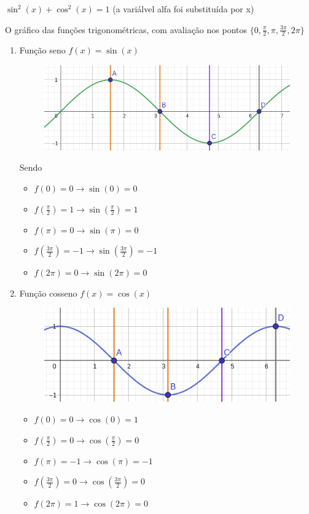 \begin{multicols*}{2}
    $\sin^2(x) + \cos^2(x) = 1$ (a variálvel alfa foi substituída por x)
    
    O gráfico das funções trigonométricas, com avaliação nos pontos 
    $\Big\{ 0, \frac{\pi}{2}, \pi, \frac{3 \pi}{2}, 2 \pi \Big\}$
    
    \begin{enumerate}
    \item Função seno $f(x) = \sin(x)$
    \begin{figure}[H]
        \includegraphics[scale=0.3]{assets/rafael/img33.png}
    \end{figure}
    Sendo 
    \begin{itemize}
    \item $f(0) = 0 \rightarrow \sin(0) = 0 $
    \item $f\left(\frac{\pi}{2} \right) = 1 \rightarrow \sin \left( \frac{\pi}{2} \right) = 1 $
    \item $f(\pi) = 0 \rightarrow \sin(\pi) = 0$
    \item $f\left( \frac{3 \pi}{2} \right) = -1 \rightarrow \sin \left( \frac{3 \pi}{2}\right) = -1$
    \item $f(2 \pi) = 0 \rightarrow \sin(2 \pi) = 0$
    \end{itemize}
    
    \item Função cosseno $f(x) = \cos(x)$
    \begin{figure}[H]
        \includegraphics[scale=0.35]{assets/rafael/img34.png}
    \end{figure}
    \begin{itemize}
    \item $f(0) = 0 \rightarrow \cos(0) = 1 $
    \item $f\left(\frac{\pi}{2} \right) = 0 \rightarrow \cos \left( \frac{\pi}{2} \right) = 0 $
    \item $f(\pi) = -1 \rightarrow \cos(\pi) = -1$
    \item $f\left( \frac{3 \pi}{2} \right) = 0 \rightarrow \cos \left( \frac{3 \pi}{2}\right) = 0$
    \item $f(2 \pi) = 1 \rightarrow \cos(2 \pi) = 0$
    \end{itemize}
    

\end{enumerate}
\end{multicols*}
